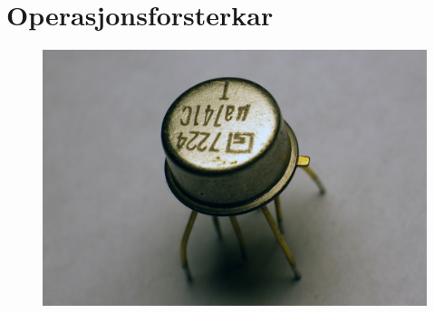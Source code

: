 \documentclass[../../multi-file-example.tex]{subfiles}
\begin{document}
\chapter{Operasjonsforsterkar}

\begin{figure}[ht!]
	\centering
	\includegraphics[width=0.7\linewidth]{common-img/opamp}
	\caption{}
	\label{fig:opamp}
\end{figure}
\end{document}
